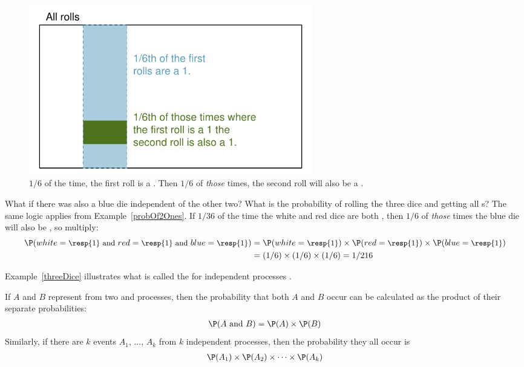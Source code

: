 \documentclass{ccg-topic}
\begin{document}
\begin{figure}[hht]
\centering
\includegraphics[width=0.6\textwidth]{ch_probability/figures/indepForRollingTwo1s/indepForRollingTwo1s}
\caption{$1/6$ of the time, the first roll is a . Then $1/6$ of \emph{those} times, the second roll will also be a .}
\label{indepForRollingTwo1s}
\end{figure}

\begin{ex}{What if there was also a blue die independent of the other two? What is the probability of rolling the three dice and getting all s?}\label{threeDice}
The same logic applies from Example~\ref{probOf2Ones}. If $1/36$ of the time the white and red dice are both , then $1/6$ of \emph{those} times the blue die will also be , so multiply:
{\begin{align*}
\P(white=\text{\small\resp{1} and } red=\text{\small\resp{1} and } blue=\text{\small\resp{1}})
	&= \P(white=\text{\small\resp{1}})\times \P(red=\text{\small\resp{1}})\times \P(blue=\text{\small\resp{1}}) \\
	&= (1/6)\times (1/6)\times (1/6)
	= 1/216
\end{align*}} \vspace{-7mm}
\end{ex}

Example~\ref{threeDice} illustrates what is called the  for independent processes . 

\begin{defn}
  If $A$ and $B$ represent  from two  and
   processes, then the probability that both $A$
  and $B$ occur can be calculated as the product of their
  separate probabilities:
  \begin{align*}
  \P(A \text{ and }B) = \P(A) \times  \P(B)
  \end{align*}
  Similarly, if there are $k$ events $A_1$, ..., $A_k$
  from $k$ independent processes, then the probability
  they all occur is
  \begin{align*}
  \P(A_1) \times  \P(A_2)\times  \cdots \times  \P(A_k)
  \end{align*}\vspace{-6mm}
\end{defn}
\end{document}
